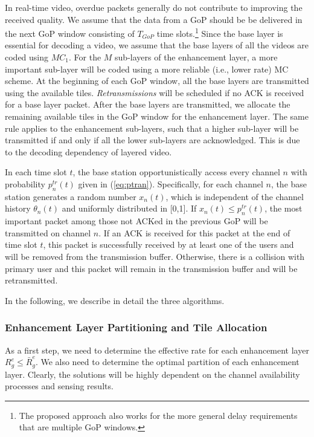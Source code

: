 \documentclass[12pt,onecolumn,draftclsnofoot]{IEEEtran} %
\begin{document}
In real-time video, overdue packets generally do not contribute to improving the received quality.  We assume that the data from a GoP should be be delivered in the next GoP window consisting of $T_{GoP}$ time slots.\footnote{The proposed approach also works for the more general delay requirements that are multiple GoP windows.} Since the base layer is essential for decoding a video, we assume that the base layers of all the videos are coded using $MC_1$. For the $M$ sub-layers of the enhancement layer, a more important sub-layer will be coded using a more reliable (i.e., lower rate) MC scheme.  At the beginning of each GoP window, all the base layers are transmitted using the available tiles.  {\em Retransmissions} will be scheduled if no ACK is received for a base layer packet.  After the base layers are transmitted, we allocate the remaining available tiles in the GoP window for the enhancement layer. The same rule applies to the enhancement sub-layers, such that a higher sub-layer will be transmitted if and only if all the lower sub-layers are acknowledged. This is due to the decoding dependency of layered video. 
  
In each time slot $t$, the base station opportunistically access every channel $n$ with probability $p_n^{tr}(t)$ given in (\ref{eq:ptran}).  Specifically, for each channel $n$, the base station generates a random number $x_n(t)$, which is independent of the channel history $\theta_n(t)$ and uniformly distributed in [0,1].  If $x_n(t) \leq p_n^{tr}(t)$, the most important packet among those not ACKed in the previous GoP will be transmitted on channel $n$. If an ACK is received for this packet at the end of time slot $t$, this packet is successfully received by at least one of the users and will be removed from the transmission buffer. Otherwise, there is a collision with primary user and this packet will remain in the transmission buffer and will be retransmitted. 

In the following, we describe in detail the three algorithms. 


\subsubsection{Enhancement Layer Partitioning and Tile Allocation \label{subsec:part}}

As a first step, we need to determine the effective rate for each enhancement layer $R_g^e \leq \bar{R}^e_g$.  We also need to determine the optimal partition of each enhancement layer. Clearly, the solutions will be highly dependent on the channel availability processes and sensing results.  
\end{document}
